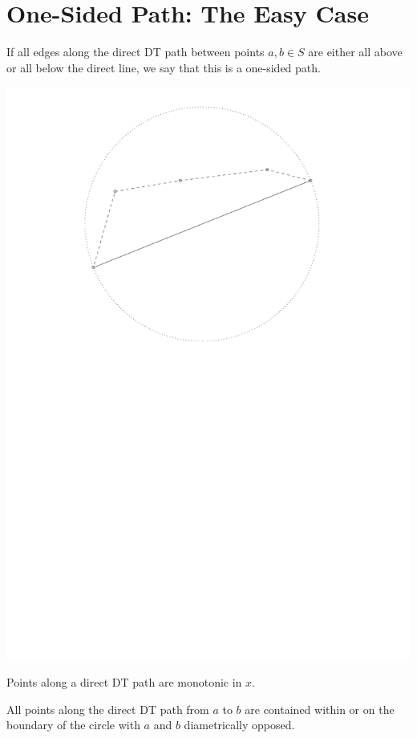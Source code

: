 \documentclass{tufte-handout}
\begin{document}
\section{One-Sided Path: The Easy Case}

If all edges along the direct DT path between points $a,b \in S$ are
either all above or all below the direct line, we say that this is a
one-sided path.

\includegraphics[scale=0.75]{figures/one-sided_path.pdf}

\begin{Lemma}

  Points along a direct DT path are monotonic in $x$.

\end{Lemma}

\begin{Lemma}

  All points along the direct DT path from $a$ to $b$ are contained
  within or on the boundary of the circle with $a$ and $b$
  diametrically opposed.
  
\end{Lemma}
\end{document}
